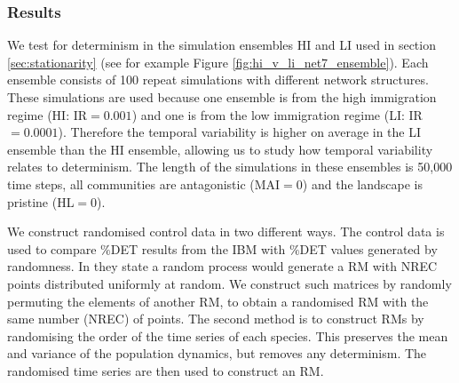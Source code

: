 

\subsubsection{Results}
\label{sec:rqa_results}

We test for determinism in the simulation ensembles HI and LI used in section \ref{sec:stationarity} (see for example Figure \ref{fig:hi_v_li_net7_ensemble}).  Each ensemble consists of 100 repeat simulations with different network structures. These simulations are used because one ensemble is from the high immigration regime (HI: IR$=0.001$) and one is from the low immigration regime (LI: IR$=0.0001$). Therefore the temporal variability is higher on average in the LI ensemble than the HI ensemble, allowing us to study how temporal variability relates to determinism. The length of the simulations in these ensembles is 50,000 time steps, all communities are antagonistic (MAI$=0$) and the landscape is pristine (HL$=0$). 

We construct randomised control data in two different ways. The control data is used to compare $\%$DET results from the IBM with $\%$DET values generated by randomness. In \cite{aparicio2008detecting} they state a random process would generate a RM with NREC points distributed uniformly at random. We construct such matrices by randomly permuting the elements of another RM, to obtain a randomised RM with the same number (NREC) of points. The second method is to construct RMs by randomising the order of the time series of each species. This preserves the mean and variance of the population dynamics, but removes any determinism. The randomised time series are then used to construct an RM.         

